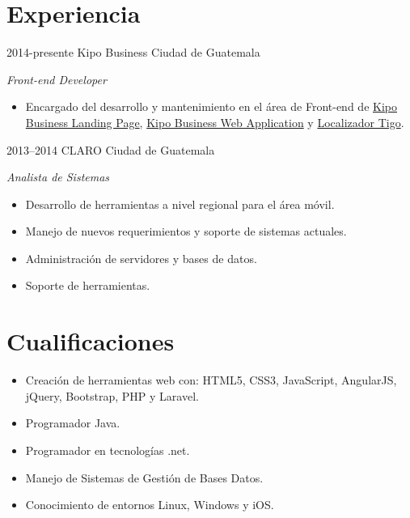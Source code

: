 \documentclass[]{friggeri-cv} %
\begin{document}
\section{Experiencia}
\begin{entrylist}
\entry
	{2014-presente}
	{Kipo Business}
	{Ciudad de Guatemala}
	{\emph{Front-end Developer} \\
	
	\begin{itemize}
		\item Encargado del desarrollo y mantenimiento en el área de Front-end de \href{https://kipobusiness.com/}{Kipo Business Landing Page}, \href{https://app.kipobusiness.com/}{Kipo Business Web Application} y \href{http://localizador.tigo.com.gt/}{Localizador Tigo}.
	\end{itemize}
	
	}
	
\entry
	{2013--2014}
	{CLARO}
	{Ciudad de Guatemala}
	{\emph{Analista de Sistemas} \\
	
	\begin{itemize}
		\item Desarrollo de herramientas a nivel regional para el área móvil. 
		\item Manejo de nuevos requerimientos y soporte de sistemas actuales.
		\item Administración de servidores y bases de datos.
		\item Soporte de herramientas.
	\end{itemize}
	
	}



\end{entrylist}


\section{Cualificaciones}
\begin{itemize}
	\item Creación de herramientas web con: HTML5, CSS3, JavaScript, AngularJS, jQuery, Bootstrap, PHP y Laravel.
	\item Programador Java.
	\item Programador en tecnologías .net.
	\item Manejo de Sistemas de Gestión de Bases Datos.
	\item Conocimiento de entornos Linux, Windows y iOS.

\end{itemize}
\end{document}
